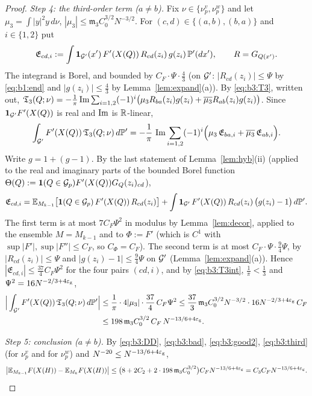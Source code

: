 \begin{proof}
\smallskip\noindent\emph{Step 4: the third-order term ($a\ne b$).} Fix $\nu\in\{\nu^v_p,\nu^w_p\}$ and let $\mu_3=\int|y|^2y\,d\nu$, $|\mu_3|\le\mathfrak m_3C_0^{3/2}N^{-3/2}$. For $(c,d)\in\{(a,b),(b,a)\}$ and $i\in\{1,2\}$ put
\[
\mathfrak E_{cd,i}:=\int\mathbf 1_{\mathcal{G}'}(x')\,F'(X(Q))\,R_{cd}(z_i)\,g(z_i)\,\mathbb{P}'(dx'),\qquad R=G_{Q(x')} .
\]
The integrand is Borel, and bounded by $C_F\cdot\Psi\cdot\frac43$ (on $\mathcal{G}'$: $|R_{cd}(z_i)|\le\Psi$ by \eqref{eq:b1:end} and $|g(z_i)|\le\frac43$ by Lemma~\ref{lem:expand}(a)). By \eqref{eq:b3:T3}, written out,
$\mathfrak T_3(Q;\nu)=-\frac1\pi\operatorname{Im}\sum_{i=1,2}(-1)^i\big(\mu_3R_{ba}(z_i)g(z_i)+\overline{\mu_3}R_{ab}(z_i)g(z_i)\big)$. Since $\mathbf 1_{\mathcal{G}'}F'(X(Q))$ is real and $\operatorname{Im}$ is $\mathbb{R}$-linear,
\begin{equation}\label{eq:b3:T3int}
\int_{\mathcal{G}'}F'(X(Q))\,\mathfrak T_3(Q;\nu)\,d\mathbb{P}'=-\frac1\pi\,\operatorname{Im}\sum_{i=1,2}(-1)^i\Big(\mu_3\,\mathfrak E_{ba,i}+\overline{\mu_3}\,\mathfrak E_{ab,i}\Big).
\end{equation}
Write $g=1+(g-1)$. By the last statement of Lemma~\ref{lem:hyb}(ii) (applied to the real and imaginary parts of the bounded Borel function $\Theta(Q):=\mathbf 1(Q\in\mathcal{G}_p)F'(X(Q))G_Q(z_i)_{cd}$),
\[
\mathfrak E_{cd,i}=\mathbb{E}_{M_{k-1}}\big[\mathbf 1(Q\in\mathcal{G}_p)\,F'(X(Q))\,R_{cd}(z_i)\big]+\int\mathbf 1_{\mathcal{G}'}\,F'(X(Q))\,R_{cd}(z_i)\,\big(g(z_i)-1\big)\,d\mathbb{P}' .
\]
The first term is at most $7C_F\Psi^2$ in modulus by Lemma~\ref{lem:decor}, applied to the ensemble $M=M_{k-1}$ and to $\Phi:=F'$ (which is $C^1$ with $\sup|F'|,\sup|F''|\le C_F$, so $C_\Phi=C_F$). The second term is at most
$C_F\cdot\Psi\cdot\frac94\Psi$, by $|R_{cd}(z_i)|\le\Psi$ and $|g(z_i)-1|\le\frac94\Psi$ on $\mathcal{G}'$ (Lemma~\ref{lem:expand}(a)). Hence $|\mathfrak E_{cd,i}|\le\frac{37}4C_F\Psi^2$ for the four pairs $(cd,i)$, and by \eqref{eq:b3:T3int},
$\frac1\pi<\frac13$ and $\Psi^2=16N^{-2/3+4\varepsilon_{\mathrm g}}$,
\begin{equation}\label{eq:b3:third}
\begin{aligned}
\Big|\int_{\mathcal{G}'}F'(X(Q))\,\mathfrak T_3(Q;\nu)\,d\mathbb{P}'\Big|&\le\frac1\pi\cdot4|\mu_3|\cdot\frac{37}4\,C_F\Psi^2\le\frac{37}3\,\mathfrak m_3C_0^{3/2}N^{-3/2}\cdot16N^{-2/3+4\varepsilon_{\mathrm g}}\,C_F\\
&\le198\,\mathfrak m_3C_0^{3/2}\,C_F\,N^{-13/6+4\varepsilon_{\mathrm g}}.
\end{aligned}
\end{equation}

\smallskip\noindent\emph{Step 5: conclusion ($a\ne b$).} By \eqref{eq:b3:DD}, \eqref{eq:b3:bad}, \eqref{eq:b3:good2}, \eqref{eq:b3:third} (for $\nu^v_p$ and for $\nu^w_p$) and $N^{-20}\le N^{-13/6+4\varepsilon_{\mathrm g}}$,
\[
\big|\mathbb{E}_{M_{k-1}}F(X(H))-\mathbb{E}_{M_k}F(X(H))\big|\le\big(8+2C_2+2\cdot198\,\mathfrak m_3C_0^{3/2}\big)C_FN^{-13/6+4\varepsilon_{\mathrm g}}=C_3C_FN^{-13/6+4\varepsilon_{\mathrm g}}.\qedhere
\]
\end{proof}

